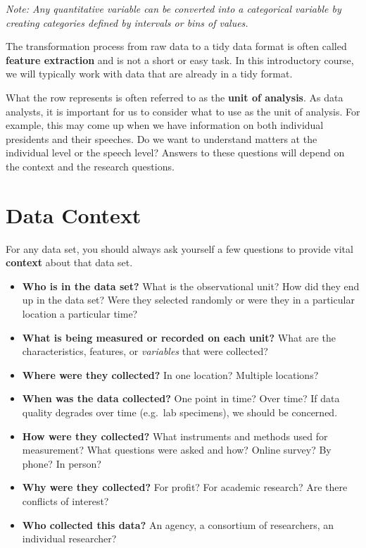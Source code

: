 \documentclass[
]{book}
\begin{document}
\emph{Note: Any quantitative variable can be converted into a categorical variable by creating categories defined by intervals or bins of values.}

The transformation process from raw data to a tidy data format is often called \textbf{feature extraction} and is not a short or easy task. In this introductory course, we will typically work with data that are already in a tidy format.

What the row represents is often referred to as the \textbf{unit of analysis}. As data analysts, it is important for us to consider what to use as the unit of analysis. For example, this may come up when we have information on both individual presidents and their speeches. Do we want to understand matters at the individual level or the speech level? Answers to these questions will depend on the context and the research questions.

\section{Data Context}\label{data-context}

For any data set, you should always ask yourself a few questions to provide vital \textbf{context} about that data set.

\begin{itemize}
\item
  \textbf{Who is in the data set?} What is the observational unit? How did they end up in the data set? Were they selected randomly or were they in a particular location a particular time?
\item
  \textbf{What is being measured or recorded on each unit?} What are the characteristics, features, or \emph{variables} that were collected?
\item
  \textbf{Where were they collected?} In one location? Multiple locations?
\item
  \textbf{When was the data collected?} One point in time? Over time? If data quality degrades over time (e.g.~lab specimens), we should be concerned.
\item
  \textbf{How were they collected?} What instruments and methods used for measurement? What questions were asked and how? Online survey? By phone? In person?
\item
  \textbf{Why were they collected?} For profit? For academic research? Are there conflicts of interest?
\item
  \textbf{Who collected this data?} An agency, a consortium of researchers, an individual researcher?
\end{itemize}
\end{document}

